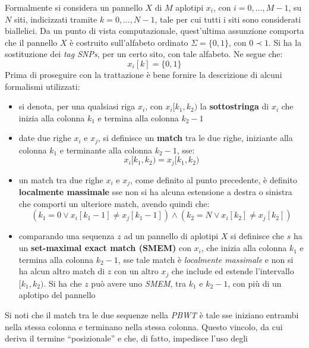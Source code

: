 Formalmente si considera un pannello $X$ di $M$ aplotipi $x_i$, con $i=0,\ldots,
M-1$, su $N$ siti, indicizzati tramite $k=0,\ldots, N-1$, tale per cui tutti i
siti sono considerati biallelici. 
Da un punto di vista computazionale, quest'ultima
assunzione comporta che il pannello $X$ è costruito sull'alfabeto ordinato
$\Sigma =\{0,1\}$, con $0\prec 1$. Si ha la sostituzione dei \textit{tag SNPs},
per un certo sito, con tale alfabeto. Ne segue che:
\begin{equation}
  \label{eq:pbwtdip}
  x_i[k]=\{0,1\}
\end{equation}
Prima di proseguire con la trattazione è bene fornire la descrizione di alcuni
formalismi utilizzati:
\begin{itemize}
  \item si denota, per una qualsiasi riga $x_i$, con $x_i[k_1,k_2)$ la
  \textbf{sottostringa} di $x_i$ che inizia alla colonna $k_1$ e termina alla
  colonna $k_2-1$
  \item date due righe $x_i$ e $x_j$, si definisce un \textbf{match} tra le due
  righe, iniziante
  alla colonna $k_1$ e terminante alla colonna $k_2-1$, sse:
  \begin{equation}
    \label{eq:pbwtmatch}
    x_i[k_1,k_2)=x_j[k_1,k_2)
  \end{equation}
  \item un match tra due righe $x_i$ e $x_j$, come definito al punto precedente,
  è definito \textbf{localmente massimale} sse non si ha alcuna estensione a
  destra o sinistra che comporti un ulteriore match, avendo quindi che:
  \begin{equation}
    \label{eq:pbwtmem}
    (k_1=0\lor x_i[k_1-1]\neq x_j[k_1-1])\land (k_2=N\lor x_i[k_2]\neq x_j[k_2])
  \end{equation}
  \item comparando una sequenza $z$ ad un pannello di aplotipi $X$ si definisce
  che $s$ ha un \textbf{set-maximal exact match (SMEM)} con $x_i$, che inizia
  alla colonna $k_1$ e termina alla colonna $k_2-1$, sse tale match è
  \textit{localmente massimale} e non si ha alcun altro match di $z$ con un
  altro $x_j$ che include ed estende l'intervallo $[k_1,k_2)$. Si ha che $z$
  può avere uno \textit{SMEM}, tra $k_1$ e $k_2-1$, con più di un aplotipo del
  pannello 
\end{itemize}
Si noti che il match tra le due sequenze nella \textit{PBWT} è tale sse iniziano
entrambi nella stessa colonna e terminano nella stessa colonna. Questo vincolo,
da cui deriva il termine ``posizionale'' e che, di fatto, impedisce l'uso degli
